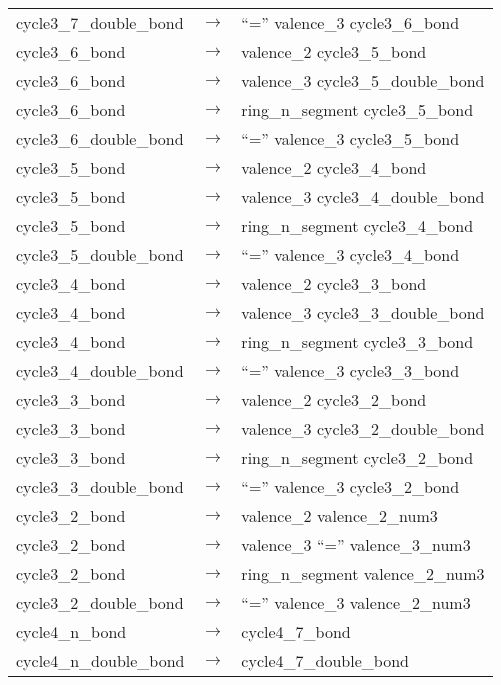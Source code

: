 \documentclass[../Document.tex]{subfiles}
\begin{document}
\begin{longtable}{m{} p{} p{}}
    cycle3\_7\_double\_bond & $\rightarrow$ & ``='' valence\_3 cycle3\_6\_bond \\
    cycle3\_6\_bond & $\rightarrow$ & valence\_2 cycle3\_5\_bond \\
    cycle3\_6\_bond & $\rightarrow$ & valence\_3 cycle3\_5\_double\_bond \\
    cycle3\_6\_bond & $\rightarrow$ & ring\_n\_segment cycle3\_5\_bond \\
    cycle3\_6\_double\_bond & $\rightarrow$ & ``='' valence\_3 cycle3\_5\_bond \\
    cycle3\_5\_bond & $\rightarrow$ & valence\_2 cycle3\_4\_bond \\
    cycle3\_5\_bond & $\rightarrow$ & valence\_3 cycle3\_4\_double\_bond \\
    cycle3\_5\_bond & $\rightarrow$ & ring\_n\_segment cycle3\_4\_bond \\
    cycle3\_5\_double\_bond & $\rightarrow$ & ``='' valence\_3 cycle3\_4\_bond \\
    cycle3\_4\_bond & $\rightarrow$ & valence\_2 cycle3\_3\_bond \\
    cycle3\_4\_bond & $\rightarrow$ & valence\_3 cycle3\_3\_double\_bond \\
    cycle3\_4\_bond & $\rightarrow$ & ring\_n\_segment cycle3\_3\_bond \\
    cycle3\_4\_double\_bond & $\rightarrow$ & ``='' valence\_3 cycle3\_3\_bond \\
    cycle3\_3\_bond & $\rightarrow$ & valence\_2 cycle3\_2\_bond \\
    cycle3\_3\_bond & $\rightarrow$ & valence\_3 cycle3\_2\_double\_bond \\
    cycle3\_3\_bond & $\rightarrow$ & ring\_n\_segment cycle3\_2\_bond \\
    cycle3\_3\_double\_bond & $\rightarrow$ & ``='' valence\_3 cycle3\_2\_bond \\
    cycle3\_2\_bond & $\rightarrow$ & valence\_2 valence\_2\_num3 \\
    cycle3\_2\_bond & $\rightarrow$ & valence\_3 ``='' valence\_3\_num3 \\
    cycle3\_2\_bond & $\rightarrow$ & ring\_n\_segment valence\_2\_num3 \\
    cycle3\_2\_double\_bond & $\rightarrow$ & ``='' valence\_3 valence\_2\_num3 \\
    cycle4\_n\_bond & $\rightarrow$ & cycle4\_7\_bond \\
    cycle4\_n\_double\_bond & $\rightarrow$ & cycle4\_7\_double\_bond \\

\end{longtable}
\end{document}
